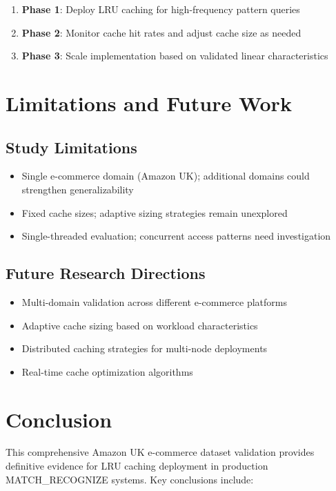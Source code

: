 \documentclass[conference]{IEEEtran}
\begin{document}
\begin{enumerate}
\item \textbf{Phase 1}: Deploy LRU caching for high-frequency pattern queries
\item \textbf{Phase 2}: Monitor cache hit rates and adjust cache size as needed
\item \textbf{Phase 3}: Scale implementation based on validated linear characteristics
\end{enumerate}

\section{Limitations and Future Work}

\subsection{Study Limitations}

\begin{itemize}
\item Single e-commerce domain (Amazon UK); additional domains could strengthen generalizability
\item Fixed cache sizes; adaptive sizing strategies remain unexplored
\item Single-threaded evaluation; concurrent access patterns need investigation
\end{itemize}

\subsection{Future Research Directions}

\begin{itemize}
\item Multi-domain validation across different e-commerce platforms
\item Adaptive cache sizing based on workload characteristics
\item Distributed caching strategies for multi-node deployments
\item Real-time cache optimization algorithms
\end{itemize}

\section{Conclusion}

This comprehensive Amazon UK e-commerce dataset validation provides definitive evidence for LRU caching deployment in production MATCH\_RECOGNIZE systems. Key conclusions include:
\end{document}
